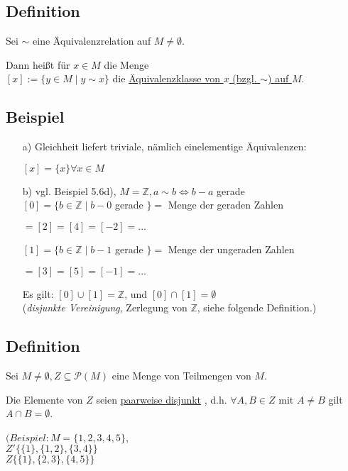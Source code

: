 \documentclass[a4paper, 12pt, twoside] {article}
\begin{document}
\subsection{Definition}
Sei $\sim$ eine Äquivalenzrelation auf $M \neq \emptyset$.

Dann heißt für $x \in M$ die Menge \\
$[x] := \{y \in M \mid y \sim x \}$ die \underline{Äquivalenzklasse von $x$ (bzgl. $\sim$) auf $M$}.

\subsection{Beispiel}

\begin{itemize}
\item[a)] Gleichheit liefert triviale, nämlich einelementige Äquivalenzen:

$[x] = \{x\} \forall x \in M$

\item[b)] vgl. Beispiel 5.6d), $M = \mathbb{Z}, a \sim b \Leftrightarrow b-a$ gerade \\
$[0] = \{b \in \mathbb{Z} \mid b-0$ gerade $\} = $ Menge der geraden Zahlen

\qquad $= [2] = [4] = [-2] = ...$

$[1] = \{b \in \mathbb{Z} \mid b-1$ gerade $\} = $ Menge der ungeraden Zahlen

\qquad $= [3] = [5] = [-1] = ...$

Es gilt: $[0] \cup [1] = \mathbb{Z}$, und $[0] \cap [1] = \emptyset$ \\
(\textit{disjunkte Vereinigung}, Zerlegung von $\mathbb{Z}$, siehe folgende Definition.)
\end{itemize}

\subsection{Definition}
Sei $M \neq \emptyset, Z \subseteq \mathcal{P}(M)$ eine Menge von Teilmengen von $M$.

Die Elemente von $Z$ seien \underline{paarweise disjunkt} , d.h. $\forall A, B \in Z$ mit $A \neq B$ gilt $A \cap B = \emptyset$.

$(Beispiel: M = \{1, 2, 3, 4, 5\}$, \\
$Z'  \{\{1\}, \{1, 2\}, \{3, 4\}\}$ \\
$Z  \{\{1\}, \{2, 3\}, \{4, 5\}\}$ \\
\end{document}
